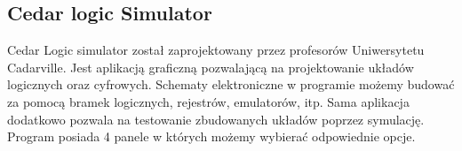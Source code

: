 \documentclass[12pt, a4paper, onside, polish]{article}				%
\begin{document}
\cleardoublepage


\subsection{Cedar logic Simulator}
\hspace{\parindent}
Cedar Logic simulator został zaprojektowany przez profesorów Uniwersytetu Cadarville. Jest aplikacją graficzną pozwalającą na projektowanie układów logicznych oraz cyfrowych. Schematy elektroniczne w programie możemy budować za pomocą bramek logicznych, rejestrów, emulatorów, itp. Sama aplikacja dodatkowo pozwala na testowanie zbudowanych układów poprzez symulację. \newline\newline
Program posiada 4 panele w których możemy wybierać odpowiednie opcje.
\end{document}
